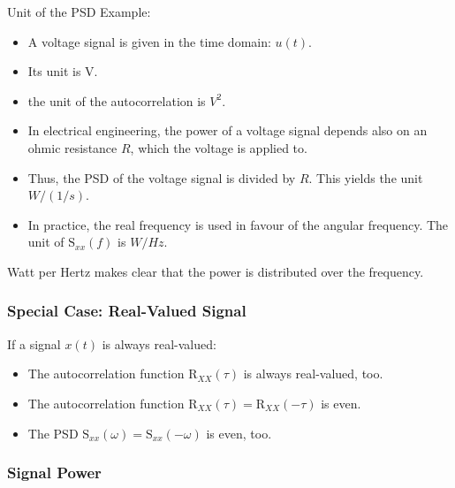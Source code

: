\begin{refsection}
\begin{excursus}{Unit of the \ac{PSD}}
	Example:
	\begin{itemize}
		\item A voltage signal is given in the time domain: $u(t)$.
		\item Its unit is \si{V}.
		\item the unit of the autocorrelation is $\si{V^2}$.
		\item In electrical engineering, the power of a voltage signal depends also on an ohmic resistance $R$, which the voltage is applied to.
		\item Thus, the \ac{PSD} of the voltage signal is divided by $R$. This yields the unit $\si{W/(1/s)}$.
		\item In practice, the real frequency is used in favour of the angular frequency. The unit of $\mathrm{S}_{xx}(f)$ is $\si{W/Hz}$.
	\end{itemize}
	Watt per Hertz makes clear that the power is distributed over the frequency.
\end{excursus}

\subsubsection{Special Case: Real-Valued Signal}

If a signal $x(t)$ is always real-valued:
\begin{itemize}
	\item The autocorrelation function $\mathrm{R}_{XX}(\tau)$ is always real-valued, too.
	\item The autocorrelation function $\mathrm{R}_{XX}(\tau) = \mathrm{R}_{XX}(-\tau)$ is even.
	\item The \ac{PSD} $\mathrm{S}_{xx}(\omega) = \mathrm{S}_{xx}(- \omega)$ is even, too.
\end{itemize}


\subsubsection{Signal Power}


\end{refsection}
